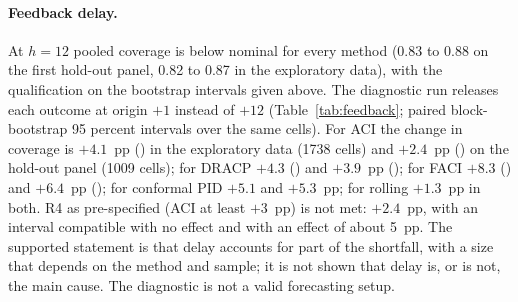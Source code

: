\begin{table}[t]
\centering
\caption{Ablation over the warm-up size: CE of ACI and rolling, ACI minus rolling and Holm $p$ at warm-up 48 (primary) and 96 (sensitivity, not promoted), by panel.}
\label{tab:ablation_warmup}
\small
\fittable{}
\end{table}

\paragraph{Feedback delay.}\label{sec:feedback} At $h=12$ pooled coverage is below nominal for every method (0.83 to 0.88 on the first hold-out panel, 0.82 to 0.87 in the exploratory data), with the qualification on the bootstrap intervals given above. The diagnostic run releases each outcome at origin $+1$ instead of $+12$ (Table~\ref{tab:feedback}; paired block-bootstrap 95 percent intervals over the same cells). For ACI the change in coverage is $+4.1$~pp () in the exploratory data (1738 cells) and $+2.4$~pp () on the hold-out panel (1009 cells); for DRACP $+4.3$ () and $+3.9$~pp (); for FACI $+8.3$ () and $+6.4$~pp (); for conformal PID $+5.1$ and $+5.3$~pp; for rolling $+1.3$~pp in both. R4 as pre-specified (ACI at least $+3$~pp) is not met: $+2.4$~pp, with an interval compatible with no effect and with an effect of about 5~pp. The supported statement is that delay accounts for part of the shortfall, with a size that depends on the method and sample; it is not shown that delay is, or is not, the main cause. The diagnostic is not a valid forecasting setup.

\begin{table}[t]
\centering
\caption{Ablation over the feedback delay (S3): coverage at $h=12$ with delayed and instant feedback, and the difference in pp with a 95\% paired block-bootstrap interval.}
\label{tab:feedback}
\small
\fittable{}
\end{table}

